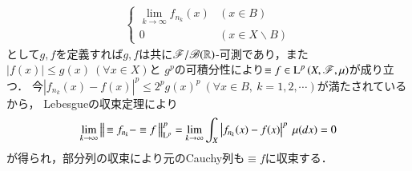 \begin{prf}
\begin{description}
\begin{align}
\begin{cases}
					\lim\limits_{k \to \infty} f_{n_k}(x) & (x \in B) \\
					0 & (x \in X \backslash B)
				\end{cases}
			\end{align}
			として$g,f$を定義すれば$g,f$は共に$\mathscr{F}/\mathscr{B}(\mathbb{R})$-可測であり，また$|f(x)| \leq g(x)\ (\forall x \in X)$と
			$g^p$の可積分性により$\equiv{f}{} \in \operatorname{L}^{p} \left(X,\mathscr{F},\mu\right)$が成り立つ．
			今$\left|f_{n_k}(x) - f(x)\right|^p \leq 2^p g(x)^p\ (\forall x \in B,\ k=1,2,\cdots)$が満たされているから，
			Lebesgueの収束定理により
			\begin{align}
				\lim_{k \to \infty}\left\|\, \equiv{f_{n_k}}{} - \equiv{f}{}\, \right\|_{\mathrm{L}^p}^p
				= \lim_{k \to \infty} \int_X \left| f_{n_k}(x) - f(x) \right|^p\ \mu(dx) = 0
			\end{align}
			が得られ，部分列の収束により元のCauchy列も$\equiv{f}{}$に収束する．
			\QED
	\end{description}
\end{prf}
